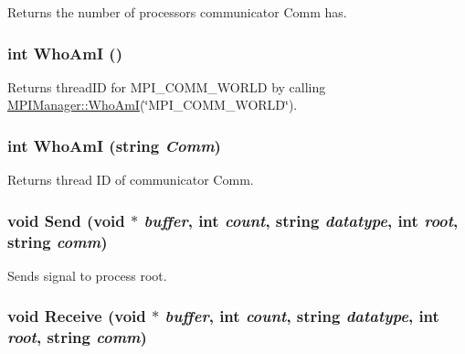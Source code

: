 Returns the number of processors communicator Comm has. \hypertarget{classJKBuilder_1_1MPIManager_a8381bb709c5cc6aec8837bacd875db19}{
\subsubsection[{WhoAmI}]{\setlength{\rightskip}{0pt plus 5cm}int WhoAmI ()}}
\label{classJKBuilder_1_1MPIManager_a8381bb709c5cc6aec8837bacd875db19}


Returns threadID for MPI\_\-COMM\_\-WORLD by calling \hyperlink{classJKBuilder_1_1MPIManager_a8381bb709c5cc6aec8837bacd875db19}{MPIManager::WhoAmI}(\char`\"{}MPI\_\-COMM\_\-WORLD\char`\"{}). \hypertarget{classJKBuilder_1_1MPIManager_ae78ccb19a8d31a623839b5a25ccd95ba}{
\subsubsection[{WhoAmI}]{\setlength{\rightskip}{0pt plus 5cm}int WhoAmI (string {\em Comm})}}
\label{classJKBuilder_1_1MPIManager_ae78ccb19a8d31a623839b5a25ccd95ba}


Returns thread ID of communicator Comm. \hypertarget{classJKBuilder_1_1MPIManager_accd63186e1017516c2c303c5683a370d}{
\subsubsection[{Send}]{\setlength{\rightskip}{0pt plus 5cm}void Send (void $\ast$ {\em buffer}, \/  int {\em count}, \/  string {\em datatype}, \/  int {\em root}, \/  string {\em comm})}}
\label{classJKBuilder_1_1MPIManager_accd63186e1017516c2c303c5683a370d}


Sends signal to process root. \hypertarget{classJKBuilder_1_1MPIManager_ab1442bcae2404867a58c12e3d1cc2b15}{
\subsubsection[{Receive}]{\setlength{\rightskip}{0pt plus 5cm}void Receive (void $\ast$ {\em buffer}, \/  int {\em count}, \/  string {\em datatype}, \/  int {\em root}, \/  string {\em comm})}}
\label{classJKBuilder_1_1MPIManager_ab1442bcae2404867a58c12e3d1cc2b15}


